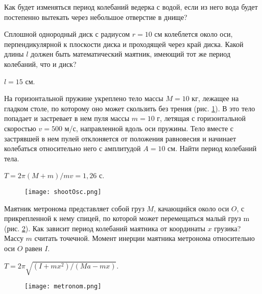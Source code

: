 \begin{ex}
Как будет изменяться период колебаний ведерка с водой, если из него вода будет постепенно вытекать через небольшое отверстие в днище?
\end{ex}	

\simpleProblems

\begin{ex} %
Сплошной однородный диск с радиусом $r = 10$ см колеблется около оси, перпендикулярной к плоскости диска и проходящей через край диска. Какой длины $l$ должен быть математический маятник, имеющий тот же период колебаний, что и диск?
\begin{ans}
$l = 15$ см.
\end{ans}
\end{ex}	

\begin{ex} %
На горизонтальной пружине укреплено тело массы $M = 10$ кг, лежащее на гладком столе, по которому оно может скользить без трения (рис. \ref{shootOsc}). В это тело попадает и застревает в нем пуля массы $m = 10$ г, летящая с горизонтальной скоростью $v = 500$ м/с, направленной вдоль оси пружины. Тело вместе с застрявшей в нем пулей отклоняется от положения равновесия и начинает колебаться относительно него с амплитудой $A = 10$ см. Найти период колебаний тела.
\begin{ans}
$T = 2 \pi (M+m) / mv = 1,26$ с.
\end{ans}
\end{ex}	

\begin{figure}[h]
\centering
\texttt{[image: shootOsc.png]}
\caption{}
\label{shootOsc}
\end{figure}

\begin{ex} %
Маятник метронома представляет собой груз $M$, качающийся около оси $O$, с прикрепленной к нему спицей, по которой может перемещаться малый груз m (рис. \ref{metronom}). Как зависит период колебаний маятника от координаты $x$ грузика? Массу $m$ считать точечной. Момент инерции маятника метронома относительно оси $O$ равен $I$.
\begin{ans}
$T = 2 \pi \sqrt{(I+mx^2)/(Ma - mx)}$.
\end{ans}
\end{ex}	

\begin{figure}[h]
\centering
\texttt{[image: metronom.png]}
\caption{}
\label{metronom}
\end{figure}

